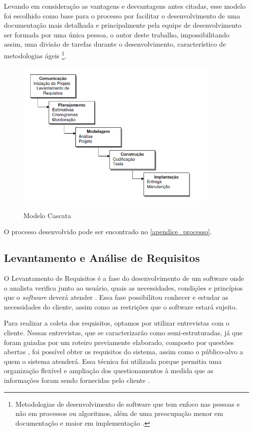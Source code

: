 Levando em consideração as vantagens e desvantagens antes citadas, esse modelo foi escolhido como base para o processo por facilitar o desenvolvimento de uma documentação mais detalhada e principalmente pela equipe de desenvolvimento ser formada por uma única pessoa, o autor deste trabalho, impossibilitando assim, uma divisão de tarefas durante o desenvolvimento, característico de metodologias ágeis \footnote{Metodologias de desenvolvimento de software que tem enfoco nas pessoas e não em processos ou algoritmos, além de uma preocupação menor em documentação e maior em implementação \cite{michel2004metodologias}.}.

\begin{figure}[H]
\centering
\caption{Modelo Cascata}
\includegraphics[width=10cm]{figuras/figura_ciclo_cascata}
\label{figura_ciclo_cascata}
\end{figure}

O processo desenvolvido pode ser encontrado no \autoref{apendice_processo}.

\subsection{Levantamento e Análise de Requisitos}


O Levantamento de Requisitos é a fase do desenvolvimento de um software onde o analista verifica junto ao usuário, quais as necessidades, condições e princípios que o \textit{software} deverá atender \cite{matuda2013mapas}. Essa fase possibilitou conhecer e estudar as necessidades do cliente, assim como as restrições que o software estará sujeito.

Para realizar a coleta dos requisitos, optamos por utilizar entrevistas com o cliente. Nessas entrevistas, que se caracterizarão como semi-estruturadas, já que foram guiadas por um roteiro previamente elaborado, composto por questões abertas \cite{belei2008uso}, foi possível obter os requisitos do sistema, assim como o público-alvo a quem o sistema atenderá. Essa técnica foi utilizada porque permitia uma organização flexível e ampliação dos questionamentos à medida que as informações foram sendo fornecidas pelo cliente \cite{fujisawa2000utilizaccao}.


